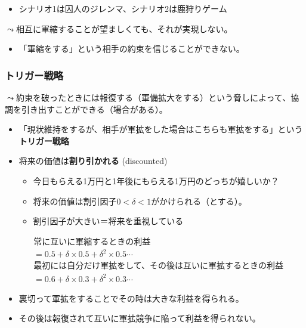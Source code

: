 \documentclass[
  xelatex,
  ja=standard]{bxjsarticle}
\providecommand{\tightlist}{%
  \setlength{\itemsep}{0pt}\setlength{\parskip}{0pt}}\usepackage{longtable,booktabs,array}
\begin{document}
\begin{itemize}
\tightlist
\item
  シナリオ1は囚人のジレンマ、シナリオ2は鹿狩りゲーム
\end{itemize}

\(\leadsto\)相互に軍縮することが望ましくても、それが実現しない。

\begin{itemize}
\tightlist
\item
  「軍縮をする」という相手の約束を信じることができない。
\end{itemize}

\hypertarget{ux30c8ux30eaux30acux30fcux6226ux7565}{%
\subsubsection{トリガー戦略}\label{ux30c8ux30eaux30acux30fcux6226ux7565}}

\(\leadsto\)約束を破ったときには報復する（軍備拡大をする）という脅しによって、協調を引き出すことができる（場合がある）。

\begin{itemize}
\tightlist
\item
  「現状維持をするが、相手が軍拡をした場合はこちらも軍拡をする」という\textbf{トリガー戦略}
\item
  将来の価値は\textbf{割り引かれる} (discounted)

  \begin{itemize}
  \tightlist
  \item
    今日もらえる1万円と1年後にもらえる1万円のどっちが嬉しいか？
  \item
    将来の価値は割引因子\(0 < \delta < 1\)がかけられる（とする）。
  \item
    割引因子が大きい＝将来を重視している
  \end{itemize}
\end{itemize}

\[
\begin{split}
&\textrm{常に互いに軍縮するときの利益} \\
&= 0.5 + \delta \times 0.5 + \delta^2 \times 0.5 \cdots \\
&\textrm{最初には自分だけ軍拡をして、その後は互いに軍拡するときの利益} \\
&= 0.6 + \delta \times 0.3 + \delta^2 \times 0.3 \cdots
\end{split}
\]

\begin{itemize}
\tightlist
\item
  裏切って軍拡をすることでその時は大きな利益を得られる。
\item
  その後は報復されて互いに軍拡競争に陥って利益を得られない。
\end{itemize}
\end{document}
